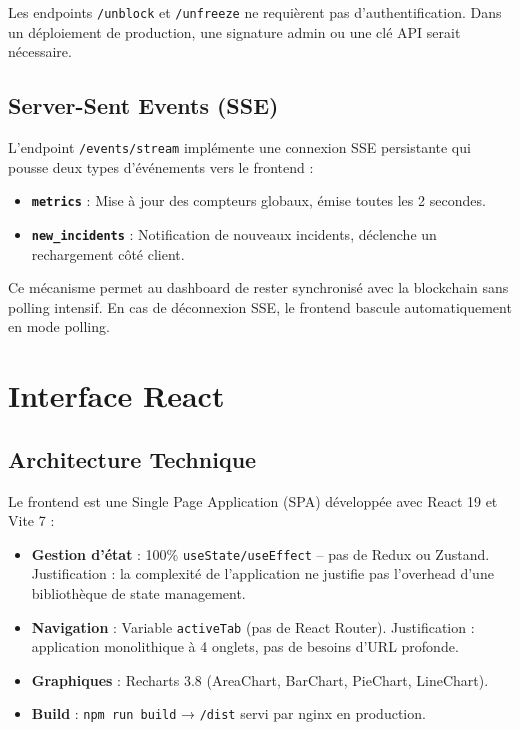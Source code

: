 \documentclass[12pt,a4paper]{report}
\newcommand{\code}[1]{\texttt{#1}}
\begin{document}
\begin{warningbox}
Les endpoints \code{/unblock} et \code{/unfreeze} ne requièrent pas d'authentification. Dans un déploiement de production, une signature admin ou une clé API serait nécessaire.
\end{warningbox}

\subsection{Server-Sent Events (SSE)}

L'endpoint \code{/events/stream} implémente une connexion SSE persistante qui pousse deux types d'événements vers le frontend :

\begin{itemize}
  \item \textbf{\code{metrics}} : Mise à jour des compteurs globaux, émise toutes les 2 secondes.
  \item \textbf{\code{new\_incidents}} : Notification de nouveaux incidents, déclenche un rechargement côté client.
\end{itemize}

Ce mécanisme permet au dashboard de rester synchronisé avec la blockchain sans polling intensif. En cas de déconnexion SSE, le frontend bascule automatiquement en mode polling.

\section{Interface React}

\subsection{Architecture Technique}

Le frontend est une Single Page Application (SPA) développée avec React 19 et Vite 7 :
\begin{itemize}
  \item \textbf{Gestion d'état} : 100\% \code{useState/useEffect} -- pas de Redux ou Zustand. Justification : la complexité de l'application ne justifie pas l'overhead d'une bibliothèque de state management.
  \item \textbf{Navigation} : Variable \code{activeTab} (pas de React Router). Justification : application monolithique à 4 onglets, pas de besoins d'URL profonde.
  \item \textbf{Graphiques} : Recharts 3.8 (AreaChart, BarChart, PieChart, LineChart).
  \item \textbf{Build} : \code{npm run build} → \code{/dist} servi par nginx en production.
\end{itemize}
\end{document}
